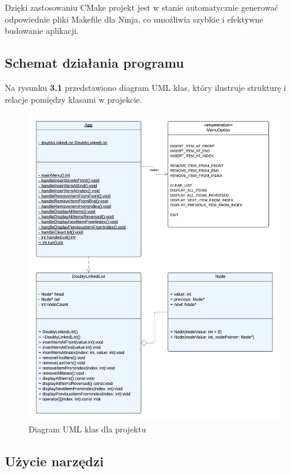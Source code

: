 Dzięki zastosowaniu CMake projekt jest w stanie automatycznie generować odpowiednie pliki Makefile dla Ninja, co umożliwia szybkie i efektywne budowanie aplikacji.

\subsection{Schemat działania programu}

Na rysunku \textbf{3.1} przedstawiono diagram UML klas, który ilustruje strukturę i relacje pomiędzy klasami w projekcie.

\begin{figure}[!htb]
  \begin{center}
    \includegraphics[width=\textwidth]{rys/diagram_UML.png}
    \caption{Diagram UML klas dla projektu}\label{fig:uml_diagram}
  \end{center}
\end{figure}

\subsection{Użycie narzędzi}

